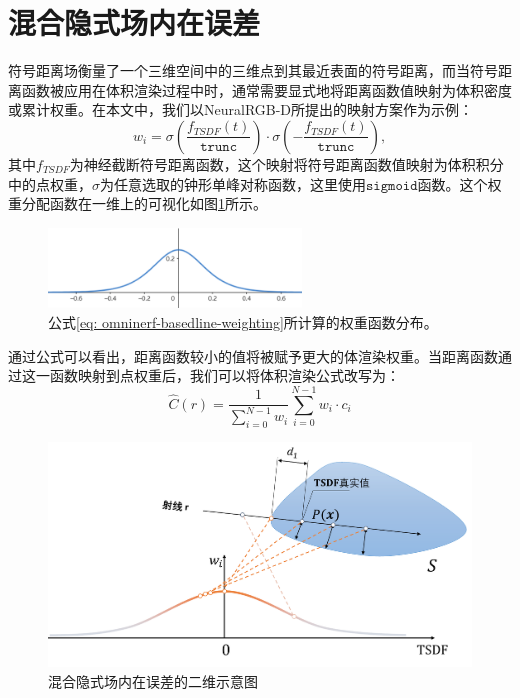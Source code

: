 \section{混合隐式场内在误差}
符号距离场衡量了一个三维空间中的三维点到其最近表面的符号距离，而当符号距离函数被应用在体积渲染过程中时，通常需要显式地将距离函数值映射为体积密度或累计权重。在本文中，我们以NeuralRGB-D\cite{azinovic_neural_2022}所提出的映射方案作为示例：
\begin{equation}
    w_i = \sigma\left(\frac{f_{TSDF}(t)}{\mathtt{trunc}}\right)\cdot\sigma\left(-\frac{f_{TSDF}(t)}{\mathtt{trunc}}\right),
    \label{eq: omninerf-basedline-weighting}
\end{equation}
其中$f_{TSDF}$为神经截断符号距离函数，这个映射将符号距离函数值映射为体积积分中的点权重，$\sigma$为任意选取的钟形单峰对称函数，这里使用$\mathtt{sigmoid}$函数。这个权重分配函数在一维上的可视化如图\ref{fig:omninerf-baseline-weighting}所示。

\begin{figure}[ht]
    \centering
    \includegraphics[width=0.6\textwidth]{undergraduate-thesis/images/neural-rgbd weighting function.png}
    \caption{公式\ref{eq: omninerf-basedline-weighting}所计算的权重函数分布。}
    \label{fig:omninerf-baseline-weighting}
\end{figure}

通过公式可以看出，距离函数较小的值将被赋予更大的体渲染权重。当距离函数通过这一函数映射到点权重后，我们可以将体积渲染公式改写为：
\begin{equation}
    \hat{C}(r) = \frac 1 {\sum_{i=0}^{N-1}w_i}\sum_{i=0}^{N-1}w_i\cdot c_i
\end{equation}

\begin{figure}[t]
    \centering
    \includegraphics[width=\textwidth]{undergraduate-thesis/images/omninerf-error2.pdf}
    \caption{混合隐式场内在误差的二维示意图}
    \label{fig:omninerf-internal error}
\end{figure}

